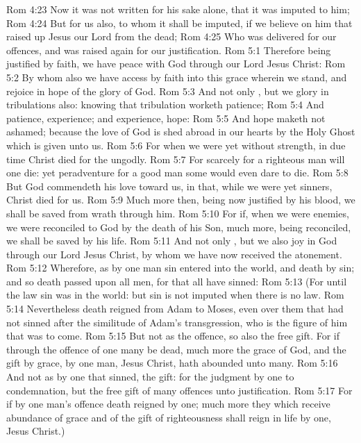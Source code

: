 \vs Rom 4:23 Now it was not written for his sake alone, that it was imputed to him;
\vs Rom 4:24 But for us also, to whom it shall be imputed, if we believe on him that raised up Jesus our Lord from the dead;
\vs Rom 4:25 Who was delivered for our offences, and was raised again for our justification.
\vs Rom 5:1 Therefore being justified by faith, we have peace with God through our Lord Jesus Christ:
\vs Rom 5:2 By whom also we have access by faith into this grace wherein we stand, and rejoice in hope of the glory of God.
\vs Rom 5:3 And not only , but we glory in tribulations also: knowing that tribulation worketh patience;
\vs Rom 5:4 And patience, experience; and experience, hope:
\vs Rom 5:5 And hope maketh not ashamed; because the love of God is shed abroad in our hearts by the Holy Ghost which is given unto us.
\vs Rom 5:6 For when we were yet without strength, in due time Christ died for the ungodly.
\vs Rom 5:7 For scarcely for a righteous man will one die: yet peradventure for a good man some would even dare to die.
\vs Rom 5:8 But God commendeth his love toward us, in that, while we were yet sinners, Christ died for us.
\vs Rom 5:9 Much more then, being now justified by his blood, we shall be saved from wrath through him.
\vs Rom 5:10 For if, when we were enemies, we were reconciled to God by the death of his Son, much more, being reconciled, we shall be saved by his life.
\vs Rom 5:11 And not only , but we also joy in God through our Lord Jesus Christ, by whom we have now received the atonement.
\vs Rom 5:12 Wherefore, as by one man sin entered into the world, and death by sin; and so death passed upon all men, for that all have sinned:
\vs Rom 5:13 (For until the law sin was in the world: but sin is not imputed when there is no law.
\vs Rom 5:14 Nevertheless death reigned from Adam to Moses, even over them that had not sinned after the similitude of Adam's transgression, who is the figure of him that was to come.
\vs Rom 5:15 But not as the offence, so also  the free gift. For if through the offence of one many be dead, much more the grace of God, and the gift by grace,  by one man, Jesus Christ, hath abounded unto many.
\vs Rom 5:16 And not as  by one that sinned,  the gift: for the judgment  by one to condemnation, but the free gift  of many offences unto justification.
\vs Rom 5:17 For if by one man's offence death reigned by one; much more they which receive abundance of grace and of the gift of righteousness shall reign in life by one, Jesus Christ.)
